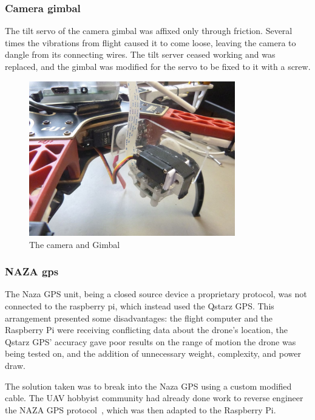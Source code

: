 \documentclass[a4paper, 12pt, titlepage]{article}
\begin{document}
		\subsubsection{Camera gimbal}
The tilt servo of the camera gimbal was affixed only through friction. Several times the vibrations from flight caused it to come loose, leaving the camera to dangle from its connecting wires. The tilt server ceased working and was replaced, and the gimbal was modified for the servo to be fixed to it with a screw.

\begin{figure}%
		\includegraphics[width=0.8\textwidth]{cameraGimbal.JPG}
		\centering
		\caption{The camera and Gimbal}
	\end{figure}
	

		\subsubsection{NAZA gps}
The Naza GPS unit, being a closed source device a proprietary protocol, was not connected to the raspberry pi, which instead used the Qstarz GPS. This arrangement presented some disadvantages: the flight computer and the Raspberry Pi were receiving conflicting data about the drone’s location, the Qstarz GPS’ accuracy gave poor results on the range of motion the drone was being tested on, and the addition of unnecessary weight, complexity, and power draw.

The solution taken was to break into the Naza GPS using a custom modified cable. The UAV hobbyist community had already done work to reverse engineer the NAZA GPS protocol~\cite{NAZArev}, which was then adapted to the Raspberry Pi.
\end{document}
